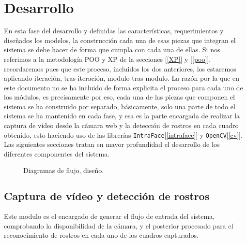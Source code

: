 \documentclass[12pt]{book} %
\begin{document}
\newpage
\section{Desarrollo}
	En esta fase del desarrollo y definidas las características, requerimientos y diseñados los modelos, la construcción  cada una de esas piezas 
	que integran el sistema se debe hacer de forma que cumpla con cada una de ellas. Si nos referimos a la metodología POO y XP de la secciones 
	[\ref{XP}] y [\ref{poo}], recordaremos pues que este proceso, incluidos los dos anteriores, los estaremos aplicando iteración, tras iteración, 
	modulo tras modulo. La razón por la que en este documento no se ha incluido de forma explicita el proceso para cada uno de los módulos, es 
	precisamente por eso, cada una de las piezas que componen el sistema se ha construido por separado, básicamente, solo una parte de todo
	el sistema se ha mantenido en cada fase, y esa es la parte encargada de realizar la captura de vídeo desde la cámara web y la detección de 
	rostros en cada cuadro obtenido, esto haciendo uso de las librerías \texttt{IntraFace}[\ref{intraface}] y \texttt{OpenCV}[\ref{cv}].\\
	
	Las siguientes secciones tratan en mayor profundidad el desarrollo de los diferentes componentes del sistema.
	
	\begin{figure}[t]
		\centering
		\caption{Diagramas de flujo, diseño.}
	\end{figure}	
	\subsection{Captura de vídeo y detección de rostros}
		Este modulo es el encargado de generar el flujo de entrada del sistema, comprobando la disponibilidad de la cámara, y el posterior 
		procesado para el reconocimiento de rostros en cada uno de los cuadros capturados.
		
\end{document}
